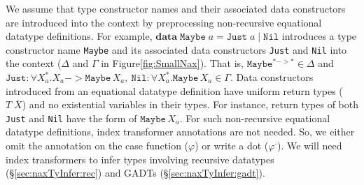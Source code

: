 We assume that type constructor names and their associated data constructors
are introduced into the context by preprocessing non-recursive equational
datatype definitions. For example,
$\textbf{data}\;\texttt{Maybe}\;a = \texttt{Just}\;a \mid \texttt{Nil}$
introduces a type constructor name \texttt{Maybe} and its associated
data constructors \texttt{Just} and \texttt{Nil} into the context
($\Delta$ and $\Gamma$ in Figure\;\ref{fig:SmallNax}). That is,
$\texttt{Maybe}^{* -> *} \in \Delta$ and
$\texttt{Just}: \forall X_a^{*}.X_a -> \texttt{Maybe}\,X_a,~
 \texttt{Nil} : \forall X_a^{*}.\texttt{Maybe}\,X_a \in \Gamma$.
Data constructors introduced from an equational datatype definition have
uniform return types ($T\;\overline{X}$) and no existential variables
in their types. For instance, return types of both \texttt{Just} and
\texttt{Nil} have the form of $\texttt{Maybe}\,X_a$. For such non-recursive
equational datatype definitions, index transformer annotations are not needed.
So, we either omit the annotation on the case function ($\varphi$) or
write a dot ($\varphi^\cdot$). We will need index transformers to infer types
involving recursive datatypes (\S\ref{sec:naxTyInfer:rec})
and GADTs (\S\ref{sec:naxTyInfer:gadt}).

